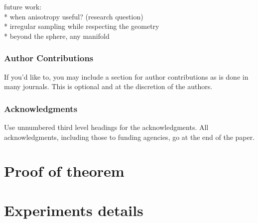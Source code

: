 \documentclass{article} %
\begin{document}
future work:\\
* when anisotropy useful? (research question)\\
* irregular sampling while respecting the geometry\\
* beyond the sphere, any manifold\\




\newpage

\subsubsection*{Author Contributions}
If you'd like to, you may include  a section for author contributions as is done
in many journals. This is optional and at the discretion of the authors.

\subsubsection*{Acknowledgments}
Use unnumbered third level headings for the acknowledgments. All
acknowledgments, including those to funding agencies, go at the end of the paper.





\newpage

{\LARGE {}}
\appendix
\section{Proof of theorem}


\section{Experiments details}
\end{document}
